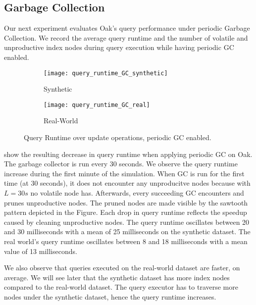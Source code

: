 \documentclass[abstracton,12pt]{scrartcl}
\theoremstyle{definition}
\begin{document}
\subsection{Garbage Collection}

\label{sec:gc-experiment}

Our next experiment evaluates Oak's query performance under periodic Garbage Collection.
We record the average query runtime and the number of volatile and unproductive 
index nodes during query execution while having periodic GC enabled.

\begin{figure}[h]
  \centering
  \begin{subfigure}{0.49\linewidth}
    \centering
    \caption{Synthetic}
    \texttt{[image: query\_runtime\_GC\_synthetic]}
    \label{fig:query_runtime_GC_synthetic}
  \end{subfigure}
  \begin{subfigure}{0.49\linewidth}
    \centering
    \caption{Real-World}
    \texttt{[image: query\_runtime\_GC\_real]}
    \label{fig:query_runtime_GC_real}
  \end{subfigure}
  \vspace{-0.5cm}
  \caption{Query Runtime over update operations, periodic GC enabled.}
\end{figure}

 show the
resulting decrease in query runtime when applying periodic GC on Oak. The
garbage collector is run every 30 seconds. We observe the query runtime
increase during the first minute of the simulation. 
When GC is run for the first time (at 30 seconds), it does not encounter
any unproducitve nodes because with $L=30s$ no volatile node has. Afterwards, every succeeding GC encounters
and prunes unproductive nodes. The pruned nodes are made visible by the
sawtooth pattern depicted in the Figure. 
Each drop in query runtime reflects the speedup caused by cleaning unproductive
nodes. The query runtime oscillates between
20 and 30 milliseconds with a mean of 25 milliseconds on the synthetic dataset.
The real world's query runtime oscillates between 8 and 18 milliseconds with a mean
value of 13 milliseconds.

We also observe that queries executed on the real-world dataset are faster,
on average. We will see later that the synthetic dataset has more index
nodes compared to the real-world dataset. The query executor has to traverse
more nodes under the synthetic dataset, hence the query runtime increases.
\end{document}
